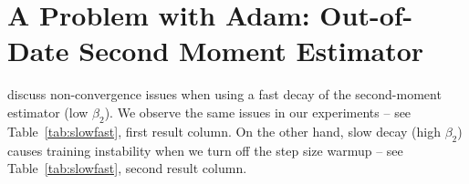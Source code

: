 \documentclass{article}
\begin{document}



\section{A Problem with Adam: Out-of-Date Second Moment Estimator}
\label{sec:msupu}

\citet{Sashank18Convergence} discuss non-convergence issues when using a fast decay of the second-moment estimator (low $\beta_2$).  We observe the same issues in our experiments -- see Table~\ref{tab:slowfast}, first result column.  On the other hand, slow decay (high $\beta_2$) causes training instability when we turn off the step size warmup -- see Table~\ref{tab:slowfast}, second result column.
\end{document}
